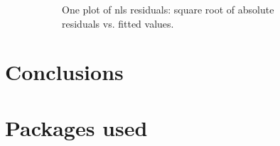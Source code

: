 \documentclass[
12pt, %
a4paper, %
oneside, %
headinclude,footinclude, %
BCOR5mm, %
]{scrartcl}
\begin{document}
\begin{figure}[H]
\begin{subfigure}{0.6\textwidth}
  \caption{One plot of nls residuals: square root of absolute residuals vs. fitted values.}
  \label{fig:logistic_smry1}
\end{subfigure}
\caption{ }
\label{fig:logistic_plots_set2}
\end{figure}

\clearpage

\section{Conclusions}

\section{Packages used}






\renewcommand{\refname}{\spacedlowsmallcaps{References}} %




\end{document}
